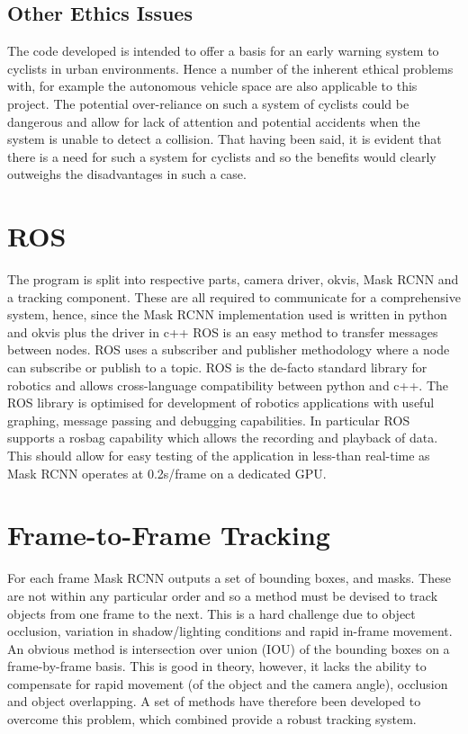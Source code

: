 \documentclass[a4paper,11pt,notitlepage]{article}
\begin{document}
\subsection{Other Ethics Issues}

The code developed is intended to offer a basis for an early warning system to cyclists in urban environments. Hence a number of the inherent ethical problems with, for example the autonomous vehicle space are also applicable to this project. The potential over-reliance on such a system of cyclists could be dangerous and allow for lack of attention and potential accidents when the system is unable to detect a collision. That having been said, it is evident that there is a need for such a system for cyclists and so the benefits would clearly outweighs the disadvantages in such a case.

\section{ROS}

The program is split into respective parts, camera driver, okvis, Mask RCNN and a tracking component. These are all required to communicate for a comprehensive system, hence, since the Mask RCNN implementation used is written in python and okvis plus the driver in c++ ROS is an easy method to transfer messages between nodes. ROS uses a subscriber and publisher methodology where a node can subscribe or publish to a topic. ROS is the de-facto standard library for robotics and allows cross-language compatibility between python and c++.
\newline \newline
The ROS library is optimised for development of robotics applications with useful graphing, message passing and debugging capabilities. In particular ROS supports a rosbag capability which allows the recording and playback of data. This should allow for easy testing of the application in less-than real-time as Mask RCNN operates at 0.2s/frame on a dedicated GPU.


\section{Frame-to-Frame Tracking}

For each frame Mask RCNN outputs a set of bounding boxes, and masks. These are not within any particular order and so a method must be devised to track objects from one frame to the next. This is a hard challenge due to object occlusion, variation in shadow/lighting conditions and rapid in-frame movement. An obvious method is intersection over union (IOU) of the bounding boxes on a frame-by-frame basis. This is good in theory, however, it lacks the ability to compensate for rapid movement (of the object and the camera angle), occlusion and object overlapping. A set of methods have therefore been developed to overcome this problem, which combined provide a robust tracking system.
\end{document}
